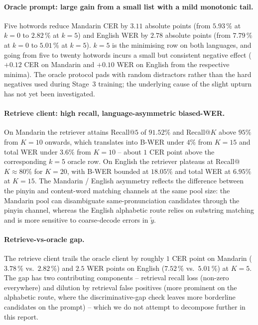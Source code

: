\paragraph{Oracle prompt: large gain from a small list with a mild
monotonic tail.}
Five hotwords reduce Mandarin CER by $3.11$ absolute points (from
$5.93$\,\% at $k=0$ to $2.82$\,\% at $k=5$) and English WER by
$2.78$ absolute points (from $7.79$\,\% at $k=0$ to $5.01$\,\% at
$k=5$). $k=5$ is the minimising row on both languages, and going
from five to twenty hotwords incurs a small but consistent
negative effect ($+0.12$ CER on Mandarin and $+0.10$ WER on
English from the respective minima). The oracle protocol pads
with random distractors rather than the hard negatives used during
Stage~3 training; the underlying cause of the slight upturn has
not yet been investigated.

\paragraph{Retrieve client: high recall, language-asymmetric biased-WER.}
On Mandarin the retriever attains Recall@$5$ of $91.52\%$ and
Recall@$K$ above $95\%$ from $K=10$ onwards, which translates into
B-WER under $4\%$ from $K=15$ and total WER under $3.6\%$ from
$K=10$ -- about $1$ CER point above the corresponding $k=5$ oracle
row. On English the retriever plateaus at Recall@$K \approx 80\%$
for $K=20$, with B-WER bounded at $18.05\%$ and total WER at
$6.95\%$ at $K=15$. The Mandarin / English asymmetry reflects the
difference between the pinyin and content-word matching channels
at the same pool size: the Mandarin pool can disambiguate
same-pronunciation candidates through the pinyin channel, whereas
the English alphabetic route relies on substring matching and is
more sensitive to coarse-decode errors in $\tilde{y}$.

\paragraph{Retrieve-vs-oracle gap.}
The retrieve client trails the oracle client by roughly $1$ CER
point on Mandarin ($3.78$\,\% vs.\ $2.82$\,\%) and $2.5$ WER points
on English ($7.52$\,\% vs.\ $5.01$\,\%) at $K=5$. The gap has two
contributing components -- retrieval recall loss (non-zero
everywhere) and dilution by retrieval false positives (more
prominent on the alphabetic route, where the discriminative-gap
check leaves more borderline candidates on the prompt) -- which we
do not attempt to decompose further in this report.

